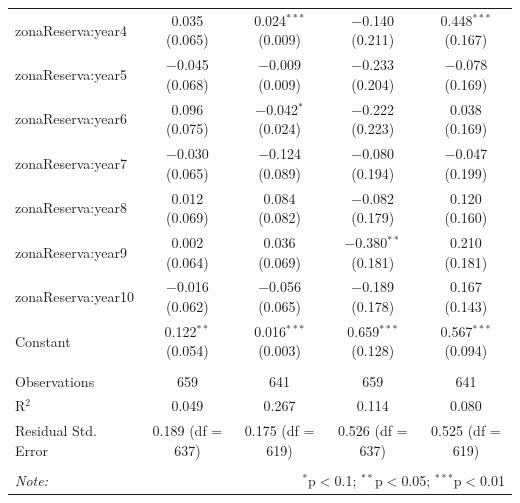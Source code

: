 \documentclass[10pt]{article}
\begin{document}
\begin{table}[h]
\begin{tabular}{@{\extracolsep{1pt}}lcccc}
  zonaReserva:year4 & 0.035 (0.065) & 0.024$^{***}$ (0.009) & $-$0.140 (0.211) & 0.448$^{***}$ (0.167) \\ 
  zonaReserva:year5 & $-$0.045 (0.068) & $-$0.009 (0.009) & $-$0.233 (0.204) & $-$0.078 (0.169) \\ 
  zonaReserva:year6 & 0.096 (0.075) & $-$0.042$^{*}$ (0.024) & $-$0.222 (0.223) & 0.038 (0.169) \\ 
  zonaReserva:year7 & $-$0.030 (0.065) & $-$0.124 (0.089) & $-$0.080 (0.194) & $-$0.047 (0.199) \\ 
  zonaReserva:year8 & 0.012 (0.069) & 0.084 (0.082) & $-$0.082 (0.179) & 0.120 (0.160) \\ 
  zonaReserva:year9 & 0.002 (0.064) & 0.036 (0.069) & $-$0.380$^{**}$ (0.181) & 0.210 (0.181) \\ 
  zonaReserva:year10 & $-$0.016 (0.062) & $-$0.056 (0.065) & $-$0.189 (0.178) & 0.167 (0.143) \\ 
  Constant & 0.122$^{**}$ (0.054) & 0.016$^{***}$ (0.003) & 0.659$^{***}$ (0.128) & 0.567$^{***}$ (0.094) \\ 
 \hline \\[-1.8ex] 
Observations & 659 & 641 & 659 & 641 \\ 
R$^{2}$ & 0.049 & 0.267 & 0.114 & 0.080 \\ 
Residual Std. Error & 0.189 (df = 637) & 0.175 (df = 619) & 0.526 (df = 637) & 0.525 (df = 619) \\ 
\hline 
\hline \\[-1.8ex] 
\textit{Note:}  & \multicolumn{4}{r}{$^{*}$p$<$0.1; $^{**}$p$<$0.05; $^{***}$p$<$0.01} \\ 
\end{tabular} 
\end{table} 


\clearpage
\end{document}
